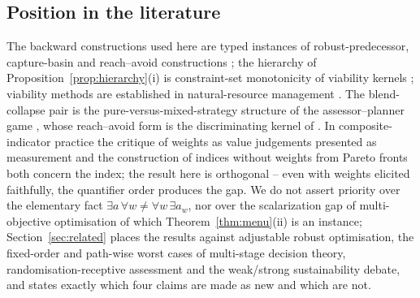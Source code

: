\documentclass[preprint,11pt,authoryear]{elsarticle}
\theoremstyle{definition}
\theoremstyle{remark}
\begin{document}
\subsection{Position in the literature}

The backward constructions used here are typed instances of robust-predecessor, capture-basin and reach--avoid constructions \citep{Aubin1991,Aubin2011,SaintPierre1994,Lygeros1999,AubinCatte2002}; the hierarchy of Proposition~\ref{prop:hierarchy}(i) is constraint-set monotonicity of viability kernels \citep{Aubin1991,Frankowska1989}; viability methods are established in natural-resource management \citep{DeLaraDoyen2008,Doyen2012}. The blend-collapse pair is the pure-versus-mixed-strategy structure of the assessor--planner game \citep{vonNeumann1928,Sion1958}, whose reach--avoid form is the discriminating kernel of \citet{Cardaliaguet1996}. In composite-indicator practice the critique of weights as value judgements presented as measurement \citep{Hickel2020,Fischer2022} and the construction of indices without weights from Pareto fronts \citep{Gao2023} both concern the index; the result here is orthogonal -- even with weights elicited faithfully, the quantifier order produces the gap. We do not assert priority over the elementary fact $\exists a\,\forall w\ne\forall w\,\exists a_w$, nor over the scalarization gap of multi-objective optimisation of which Theorem~\ref{thm:menu}(ii) is an instance; Section~\ref{sec:related} places the results against adjustable robust optimisation, the fixed-order and path-wise worst cases of multi-stage decision theory, randomisation-receptive assessment and the weak/strong sustainability debate, and states exactly which four claims are made as new and which are not.
\end{document}
